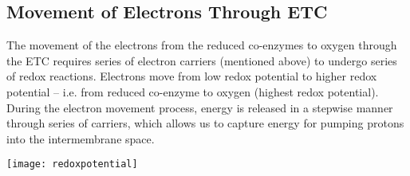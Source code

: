 \subsection{Movement of Electrons Through ETC}

The movement of the electrons from the reduced co-enzymes to oxygen through the ETC requires series of electron carriers (mentioned above) to undergo series of redox reactions.
Electrons move from low redox potential to higher redox potential -- i.e. from reduced co-enzyme to oxygen (highest redox potential).
During the electron movement process, energy is released in a stepwise manner through series of carriers, which allows us to capture energy for pumping protons into the intermembrane space.

\begin{center}
\texttt{[image: redoxpotential]}
\end{center}

